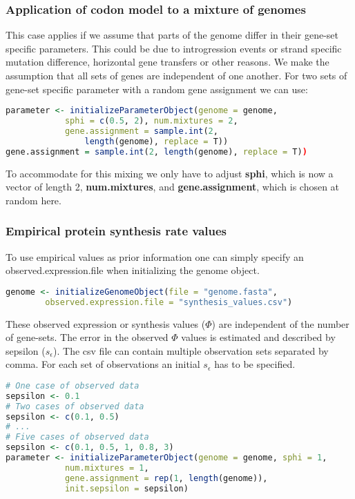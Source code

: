 \subsubsection{Application of codon model to a mixture of genomes}
This case applies if we assume that parts of the genome differ in their gene-set specific parameters. 
This could be due to introgression events or strand specific mutation difference, horizontal gene transfers or other reasons. 
We make the assumption that all sets of genes are independent of one another. 
For two sets of gene-set specific parameter with a random gene assignment we can use:

\begin{lstlisting}[language=R]
parameter <- initializeParameterObject(genome = genome, 
			sphi = c(0.5, 2), num.mixtures = 2,
			gene.assignment = sample.int(2, 
				length(genome), replace = T))
gene.assignment = sample.int(2, length(genome), replace = T))
\end{lstlisting}

To accommodate for this mixing we only have to adjust \textbf{sphi}, which is now a vector of length 2, \textbf{num.mixtures},
and \textbf{gene.assignment}, which is chosen at random here.

\subsubsection{Empirical protein synthesis rate values}
To use empirical values as prior information one can simply specify an observed.expression.file when
initializing the genome object.

\begin{lstlisting}[language=R]
genome <- initializeGenomeObject(file = "genome.fasta",
		observed.expression.file = "synthesis_values.csv")
\end{lstlisting}

These observed expression or synthesis values ($\Phi$) are independent of the number of gene-sets. 
The error in the observed $\Phi$ values is estimated and described by sepsilon ($s_\epsilon$). 
The csv file can contain multiple observation sets separated by comma.
For each set of observations an initial $s_\epsilon$ has to be specified.

\begin{lstlisting}[language=R]
# One case of observed data
sepsilon <- 0.1
# Two cases of observed data
sepsilon <- c(0.1, 0.5)
# ...
# Five cases of observed data
sepsilon <- c(0.1, 0.5, 1, 0.8, 3)
parameter <- initializeParameterObject(genome = genome, sphi = 1, 
			num.mixtures = 1,
			gene.assignment = rep(1, length(genome)),
			init.sepsilon = sepsilon)
\end{lstlisting}

